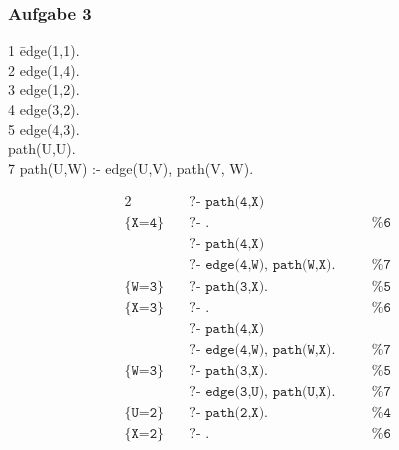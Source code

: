 \documentclass[aspectratio=1610,onlymath, ngerman]{beamer}
\begin{document}
	\begin{frame} \frametitle{Aufgabe 3}
		\begin{minipage}{\dimexpr0.5\linewidth-\fboxrule-\fboxsep}
			
			\begin{ttfamily}
				\begin{tabbing}
					1 \quad \= edge(1,1). \\
					2 \> edge(1,4). \\
					3 \> edge(1,2). \\
					4 \> edge(3,2). \\
					5 \> edge(4,3). \\[9pt]  \> path(U,U). \\
					7 \> path(U,W) :- edge(U,V), path(V, W).
				\end{tabbing}
			\end{ttfamily}	
		\end{minipage}
	\pause
		\begin{minipage}{\dimexpr0.5\linewidth-\fboxrule-\fboxsep}
			\begin{alignat*}{2}
			&\texttt{?- path(4,X)} \\
			\texttt{\{X=4\}} \quad &\texttt{?- .} && \texttt{\% 6 } \\[12pt]
			&\texttt{?- path(4,X)}  \\
			&\texttt{?- edge(4,W), path(W,X).} \quad && \texttt{\% 7} \\
			\texttt{\{W=3\}} \quad &\texttt{?- path(3,X).} && \texttt{\% 5} \\
			\texttt{\{X=3\}} \quad &\texttt{?- .} && \texttt{\% 6}\\[12pt]
			&\texttt{?- path(4,X)}  \\
			&\texttt{?- edge(4,W), path(W,X).} \quad && \texttt{\% 7} \\
			\texttt{\{W=3\}} \quad &\texttt{?- path(3,X).} && \texttt{\% 5} \\
			&\texttt{?- edge(3,U), path(U,X).} &&\texttt{\% 7} \\
			\texttt{\{U=2\}} \quad &\texttt{?- path(2,X).} &&\texttt{\% 4} \\
			\texttt{\{X=2\}} \quad &\texttt{?- .} &&\texttt{\% 6} \\
			\end{alignat*}
		\end{minipage}
	\end{frame}
\end{document}

